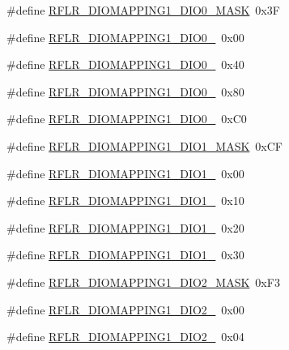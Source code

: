 \begin{DoxyCompactItemize}
\item 
\#define \hyperlink{sx1276Regs-LoRa_8h_af758e474cda2159002abe0e6180d7cd1}{R\+F\+L\+R\+\_\+\+D\+I\+O\+M\+A\+P\+P\+I\+N\+G1\+\_\+\+D\+I\+O0\+\_\+\+M\+A\+SK}~0x3F
\item 
\#define \hyperlink{sx1276Regs-LoRa_8h_ab6265039b78b19a1a30b1219633cd48b}{R\+F\+L\+R\+\_\+\+D\+I\+O\+M\+A\+P\+P\+I\+N\+G1\+\_\+\+D\+I\+O0\+\_}~0x00
\item 
\#define \hyperlink{sx1276Regs-LoRa_8h_a045b2ea3634a643b2b3c924dc7eba8ed}{R\+F\+L\+R\+\_\+\+D\+I\+O\+M\+A\+P\+P\+I\+N\+G1\+\_\+\+D\+I\+O0\+\_}~0x40
\item 
\#define \hyperlink{sx1276Regs-LoRa_8h_a71222a82d6394750e0b5fc440617c447}{R\+F\+L\+R\+\_\+\+D\+I\+O\+M\+A\+P\+P\+I\+N\+G1\+\_\+\+D\+I\+O0\+\_}~0x80
\item 
\#define \hyperlink{sx1276Regs-LoRa_8h_a9e64a93bbe4b9e41debac37fae14fa98}{R\+F\+L\+R\+\_\+\+D\+I\+O\+M\+A\+P\+P\+I\+N\+G1\+\_\+\+D\+I\+O0\+\_}~0x\+C0
\item 
\#define \hyperlink{sx1276Regs-LoRa_8h_a393a84b91029e234b6d5ca1662d137ff}{R\+F\+L\+R\+\_\+\+D\+I\+O\+M\+A\+P\+P\+I\+N\+G1\+\_\+\+D\+I\+O1\+\_\+\+M\+A\+SK}~0x\+CF
\item 
\#define \hyperlink{sx1276Regs-LoRa_8h_a722ab613c1b99d008acb7d0b5e41a19d}{R\+F\+L\+R\+\_\+\+D\+I\+O\+M\+A\+P\+P\+I\+N\+G1\+\_\+\+D\+I\+O1\+\_}~0x00
\item 
\#define \hyperlink{sx1276Regs-LoRa_8h_a52490d96aa23316e4c2722adc0f27d25}{R\+F\+L\+R\+\_\+\+D\+I\+O\+M\+A\+P\+P\+I\+N\+G1\+\_\+\+D\+I\+O1\+\_}~0x10
\item 
\#define \hyperlink{sx1276Regs-LoRa_8h_abb77d9e03102bf5f40a5761b7670c5f3}{R\+F\+L\+R\+\_\+\+D\+I\+O\+M\+A\+P\+P\+I\+N\+G1\+\_\+\+D\+I\+O1\+\_}~0x20
\item 
\#define \hyperlink{sx1276Regs-LoRa_8h_aba98ad397693e9f3768bfa7ae5a3eb6f}{R\+F\+L\+R\+\_\+\+D\+I\+O\+M\+A\+P\+P\+I\+N\+G1\+\_\+\+D\+I\+O1\+\_}~0x30
\item 
\#define \hyperlink{sx1276Regs-LoRa_8h_ac0828a1effa434c36dd94a983d54375d}{R\+F\+L\+R\+\_\+\+D\+I\+O\+M\+A\+P\+P\+I\+N\+G1\+\_\+\+D\+I\+O2\+\_\+\+M\+A\+SK}~0x\+F3
\item 
\#define \hyperlink{sx1276Regs-LoRa_8h_a2f0f04b85bbb762368832a1b37ac7711}{R\+F\+L\+R\+\_\+\+D\+I\+O\+M\+A\+P\+P\+I\+N\+G1\+\_\+\+D\+I\+O2\+\_}~0x00
\item 
\#define \hyperlink{sx1276Regs-LoRa_8h_a3c67981c0926e7c1e8d0eb1aee9afdee}{R\+F\+L\+R\+\_\+\+D\+I\+O\+M\+A\+P\+P\+I\+N\+G1\+\_\+\+D\+I\+O2\+\_}~0x04

\end{DoxyCompactItemize}
